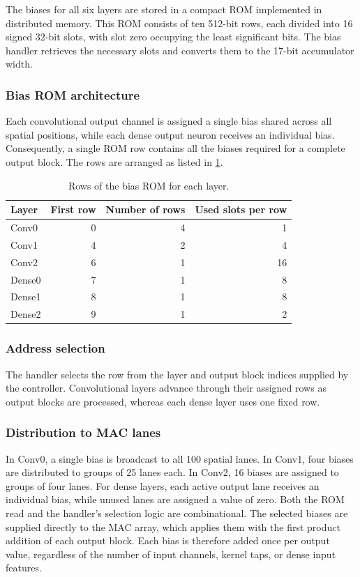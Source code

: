 The biases for all six layers are stored in a compact ROM implemented in distributed memory. This ROM consists of ten 512-bit rows, each divided into 16 signed 32-bit slots, with slot zero occupying the least significant bits. The bias handler retrieves the necessary slots and converts them to the 17-bit accumulator width.

\subsubsection{Bias ROM architecture}
Each convolutional output channel is assigned a single bias shared across all spatial positions, while each dense output neuron receives an individual bias. Consequently, a single ROM row contains all the biases required for a complete output block. The rows are arranged as listed in \cref{tab:bias-rows}.

\begin{table}[H]
    \centering
    \caption{Rows of the bias ROM for each layer.}
    \label{tab:bias-rows}
    \begin{tabular}{@{}lrrr@{}}
        \toprule
        Layer & First row & Number of rows & Used slots per row \\
        \midrule
        Conv0  & 0 & 4 &  1 \\
        Conv1  & 4 & 2 &  4 \\
        Conv2  & 6 & 1 & 16 \\
        Dense0 & 7 & 1 &  8 \\
        Dense1 & 8 & 1 &  8 \\
        Dense2 & 9 & 1 &  2 \\
        \bottomrule
    \end{tabular}
\end{table}

\subsubsection{Address selection}
The handler selects the row from the layer and output block indices supplied by the controller. Convolutional layers advance through their assigned rows as output blocks are processed, whereas each dense layer uses one fixed row.

\subsubsection{Distribution to MAC lanes}
In Conv0, a single bias is broadcast to all 100 spatial lanes. In Conv1, four biases are distributed to groups of 25 lanes each. In Conv2, 16 biases are assigned to groups of four lanes. For dense layers, each active output lane receives an individual bias, while unused lanes are assigned a value of zero. Both the ROM read and the handler's selection logic are combinational. The selected biases are supplied directly to the MAC array, which applies them with the first product addition of each output block. Each bias is therefore added once per output value, regardless of the number of input channels, kernel taps, or dense input features.

